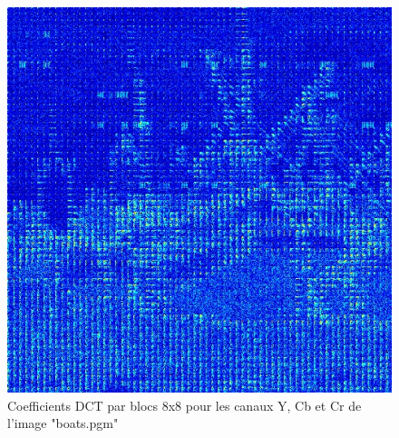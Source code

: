 \documentclass[12pt]{report}
\begin{document}
\begin{figure}[H]
\begin{center}
\includegraphics[scale=0.25]{../ImageRes/blockdct_2.jpg} 
\caption{Coefficients DCT par blocs 8x8 pour les canaux Y, Cb et Cr de l'image "boats.pgm"}
\end{center}
\end{figure}
\end{document}
